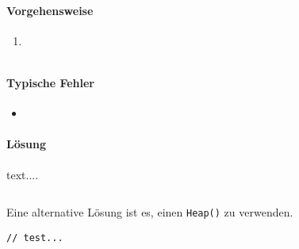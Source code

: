 \documentclass{book}
\begin{document}
\paragraph{Vorgehensweise}
\begin{enumerate} 
	\item 
\end{enumerate}

\begin{lstlisting}[caption=My Javascript Example]

\end{lstlisting}

\paragraph{Typische Fehler}
\begin{itemize} 
	\item 
\end{itemize}

\paragraph{Lösung}
text....

\begin{lstlisting}[caption=My Javascript Example]

\end{lstlisting}

Eine alternative Lösung ist es, einen \lstinline|Heap()| zu verwenden.
\begin{lstlisting}[caption=My Javascript Example]
// test...

\end{lstlisting}
\end{document}
